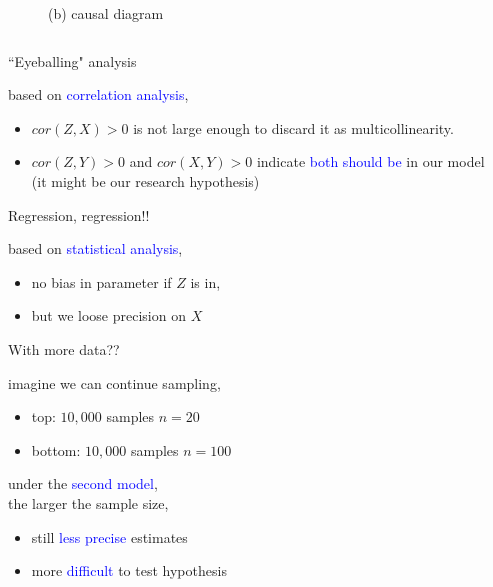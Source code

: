 \begin{frame}
\begin{columns}
\begin{column}{0.5\textwidth}
\begin{figure}
				\caption*{(b) causal diagram}
			\end{figure}
		\end{column}
	\end{columns}
\end{frame}
%
%
\begin{lhframe}[rhgraphic={\texttt{[image: pipe1\_panel.pdf]}}]
	{``Eyeballing" analysis}
	
	based on \textcolor{blue}{correlation analysis},
	\begin{itemize}
		\item $cor(Z, X)>0$ is not large enough to discard it as multicollinearity.
		\item $cor(Z, Y)>0$ and $cor(X, Y)>0$ indicate \textcolor{blue}{both should be} in our model \\
		{\small (it might be our research hypothesis)}
	\end{itemize}
\end{lhframe}
%
%
\begin{lhframe}[rhgraphic={\texttt{[image: pipe1\_reg.png]}}]
	{Regression, regression!!}
	
	based on \textcolor{blue}{statistical analysis},
	\begin{itemize}
		\item no bias in parameter if $Z$ is in,
		\item but we loose precision on $X$
	\end{itemize}
\end{lhframe}
%
%


\begin{lhframe}[rhgraphic={\texttt{[image: pipe1\_samplesize.pdf]}}]
	{With more data??}
	
	imagine we can continue sampling,
	\begin{itemize}
		\item top: $10,000$ samples $n=20$
		\item bottom: $10,000$ samples $n=100$
	\end{itemize}
	
	under the \textcolor{blue}{second model}, \\
	the larger the sample size,
	\begin{itemize}
		\item still \textcolor{blue}{less precise} estimates
		\item more \textcolor{blue}{difficult} to test hypothesis
	\end{itemize}
\end{lhframe}
%
%


